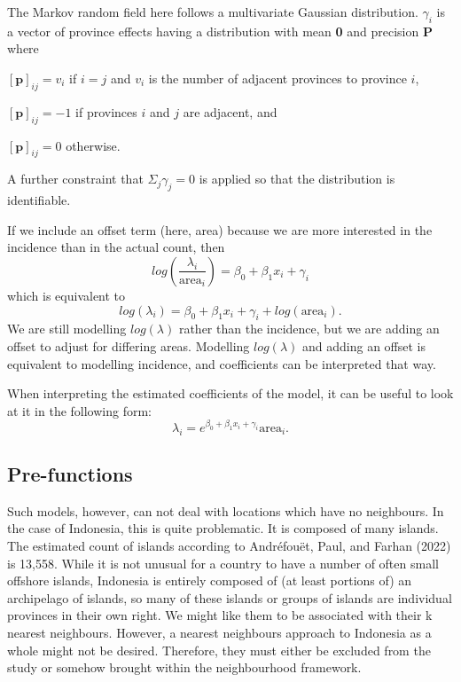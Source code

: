 The Markov random field here follows a multivariate Gaussian
distribution. \(\gamma_i\) is a vector of province effects having a
distribution with mean \textbf{0} and precision \textbf{P} where

\([\textbf{p}]_{ij} = v_i\) if \(i=j\) and \(v_i\) is the number of adjacent provinces
to province \(i\),

\([\textbf{p}]_{ij} = -1\) if provinces \(i\) and \(j\) are adjacent, and

\([\textbf{p}]_{ij} = 0\) otherwise.

A further constraint that \(\Sigma_j \gamma_j = 0\) is applied so that the
distribution is identifiable.

If we include an offset term (here, area) because we are more interested
in the incidence than in the actual count, then
\begin{equation}
log(\frac{\lambda_i} {\text{area}_i}) = \beta_0 + \beta_1x_i + \gamma_i
\label{eq:eq6}
\end{equation}
which is equivalent to
\begin{equation}
log(\lambda_i) = \beta_0 + \beta_1x_i + \gamma_i + log(\text{area}_i).
\label{eq:eq7}
\end{equation}
We are still modelling \(log(\lambda)\) rather than the incidence, but we
are adding an offset to adjust for differing areas. Modelling \(log(\lambda)\) and adding an offset is equivalent to
modelling incidence, and coefficients can be interpreted that way.

When interpreting the estimated coefficients of the model, it can be
useful to look at it in the following form:
\begin{equation}
\lambda_i = e^{\beta_0 + \beta_1 x_i + \gamma_i} \text{area}_i.
\label{eq:eq8}
\end{equation}

\hypertarget{pre-functions-1}{%
\subsection{Pre-functions}\label{pre-functions-1}}

Such models, however, can not deal with locations which have no
neighbours. In the case of Indonesia, this is quite problematic. It is
composed of many islands. The estimated count of
islands according to Andréfouët, Paul, and Farhan (2022) is 13,558.
While it is not unusual for a country to have a number of often small
offshore islands, Indonesia is entirely composed of (at least portions
of) an archipelago of islands, so many of these islands or groups of
islands are individual provinces in their own right. We might like them
to be associated with their k nearest neighbours. However, a nearest
neighbours approach to Indonesia as a whole might not be desired.
Therefore, they must either be excluded from the study or somehow
brought within the neighbourhood framework.


